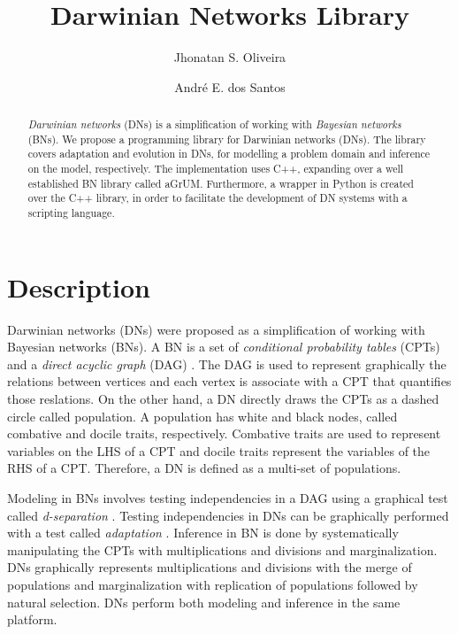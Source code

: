 \documentclass[runningheads,a4paper]{llncs}
\begin{document}
\mainmatter
\title{Darwinian Networks Library}

\author{Jhonatan S. Oliveira \and André E. dos Santos}


\maketitle

\begin{abstract}
\emph{Darwinian networks} (DNs) is a simplification of working with \emph{Bayesian networks} (BNs).
We propose a programming library for Darwinian networks (DNs).
The library covers adaptation and evolution in DNs, for modelling a problem domain and inference on the model, respectively.
The implementation uses C++, expanding over a well established BN library called aGrUM.
Furthermore, a wrapper in Python is created over the C++ library, in order to facilitate the development of DN systems with a scripting language.
\end{abstract}

\section*{Description}


Darwinian networks (DNs) \cite{butzOliveiraSantosCai15} were proposed as a simplification of working with Bayesian networks (BNs).
A BN is a set of \emph{conditional probability tables} (CPTs) and a \emph{direct acyclic graph} (DAG) \cite{pear88}.
The DAG is used to represent graphically the relations between vertices and each vertex is associate with a CPT that quantifies those reslations.
On the other hand, a DN directly draws the CPTs as a dashed circle called population.
A population has white and black nodes, called combative and docile traits, respectively.
Combative traits are used to represent variables on the LHS of a CPT and docile traits represent the variables of the RHS of a CPT.
Therefore, a DN is defined as a multi-set of populations.

Modeling in BNs involves testing independencies in a DAG using a graphical test called \emph{d-separation} \cite{pear88}.
Testing independencies in DNs can be graphically performed with a test called \emph{adaptation} \cite{butzOliveiraSantosCai15}.
Inference in BN is done by systematically manipulating the CPTs with multiplications and divisions and marginalization.
DNs graphically represents multiplications and divisions with the merge of populations and marginalization with replication of populations followed by natural selection.
DNs perform both modeling and inference in the same platform.
\end{document}
